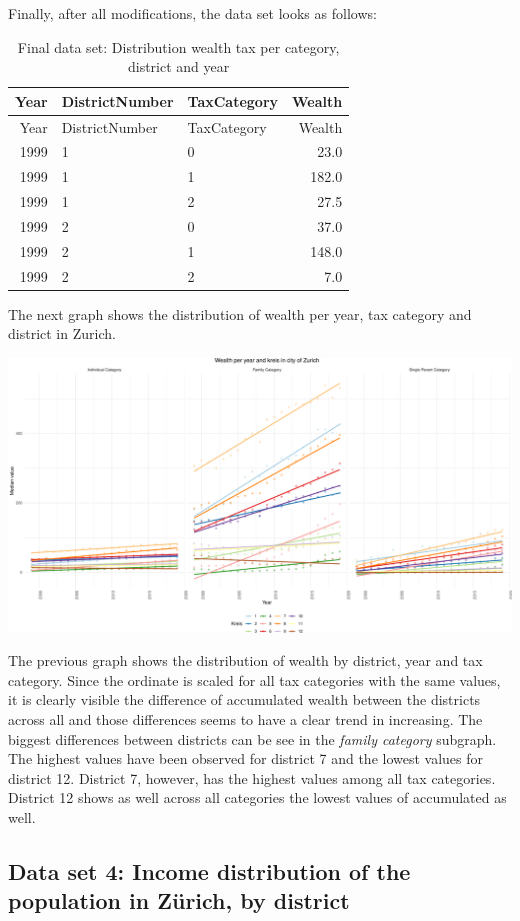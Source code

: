 \documentclass[
]{article}
\begin{document}
Finally, after all modifications, the data set looks as follows:

\begin{longtable}[]{@{}rllr@{}}
\caption{Final data set: Distribution wealth tax per category, district
and year}\tabularnewline
\toprule
Year & DistrictNumber & TaxCategory & Wealth\tabularnewline
\midrule
\endfirsthead
\toprule
Year & DistrictNumber & TaxCategory & Wealth\tabularnewline
\midrule
\endhead
1999 & 1 & 0 & 23.0\tabularnewline
1999 & 1 & 1 & 182.0\tabularnewline
1999 & 1 & 2 & 27.5\tabularnewline
1999 & 2 & 0 & 37.0\tabularnewline
1999 & 2 & 1 & 148.0\tabularnewline
1999 & 2 & 2 & 7.0\tabularnewline
\bottomrule
\end{longtable}

The next graph shows the distribution of wealth per year, tax category
and district in Zurich.

\includegraphics{report_files/figure-latex/plot_wealth-1.pdf}

The previous graph shows the distribution of wealth by district, year
and tax category. Since the ordinate is scaled for all tax categories
with the same values, it is clearly visible the difference of
accumulated wealth between the districts across all and those
differences seems to have a clear trend in increasing. The biggest
differences between districts can be see in the \emph{family category}
subgraph. The highest values have been observed for district 7 and the
lowest values for district 12. District 7, however, has the highest
values among all tax categories. District 12 shows as well across all
categories the lowest values of accumulated as well.

\hypertarget{data-set-4-income-distribution-of-the-population-in-zuxfcrich-by-district}{%
\subsection{Data set 4: Income distribution of the population in Zürich,
by
district}\label{data-set-4-income-distribution-of-the-population-in-zuxfcrich-by-district}}
\end{document}
